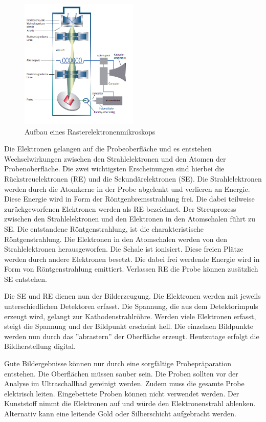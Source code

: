 \documentclass[a4paper, 11pt]{tubsreprt}
\begin{document}
\begin{figure} %
\centering
\includegraphics[width=0.5\textwidth]{Bilder/REM.png}
\caption[Aufbau eines Rasterelektronenmikroskops]{Aufbau eines Rasterelektronenmikroskops \cite{Welsch2015}}
\label{REM Aufbau}
\end{figure}

Die Elektronen gelangen auf die Probeoberfläche und es entstehen Wechselwirkungen zwischen den Strahlelektronen und den Atomen der Probenoberfläche. Die zwei wichtigsten Erscheinungen sind hierbei die Rückstreuelektronen (RE) und die Sekundärelektronen (SE). Die Strahlelektronen werden durch die Atomkerne in der Probe abgelenkt und verlieren an Energie. Diese Energie wird in Form der Röntgenbremsstrahlung frei. Die dabei teilweise zurückgeworfenen Elektronen werden als RE bezeichnet. Der Streuprozess zwischen den Strahlelektronen und den Elektronen in den Atomschalen führt zu SE. Die entstandene Röntgenstrahlung, ist die charakteristische Röntgenstrahlung. Die Elektronen in den Atomschalen werden von den Strahlelektronen herausgeworfen. Die Schale ist ionisiert. Diese freien Plätze werden durch andere Elektronen besetzt. Die dabei frei werdende Energie wird in Form von Röntgenstrahlung emittiert. Verlassen RE die Probe können zusätzlich SE entstehen.

Die SE und RE dienen nun der Bilderzeugung. Die Elektronen werden mit jeweils unterschiedlichen Detektoren erfasst. Die Spannung, die aus dem Detektorimpuls erzeugt wird, gelangt zur Kathodenstrahlröhre. Werden viele Elektronen erfasst, steigt die Spannung und der Bildpunkt erscheint hell. Die einzelnen Bildpunkte werden nun durch das ''abrastern'' der Oberfläche erzeugt. Heutzutage erfolgt die Bildherstellung digital\cite{Welsch2015}.

Gute Bildergebnisse können nur durch eine sorgfältige Probepräparation entstehen. Die Oberflächen müssen sauber sein. Die Proben sollten vor der Analyse im Ultraschallbad gereinigt werden.  Zudem muss die gesamte Probe elektrisch leiten. Eingebettete Proben können nicht verwendet werden. Der Kunststoff nimmt die Elektronen auf und würde den Elektronenstrahl ablenken. Alternativ kann eine leitende Gold oder Silberschicht aufgebracht werden.   
\end{document}
